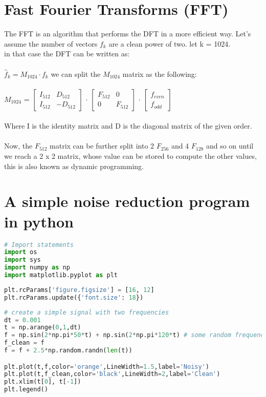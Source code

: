 \documentclass{article}
\begin{document}
\section{Fast Fourier Transforms (FFT)}
The FFT is an algorithm that performs the DFT in a more efficient way. Let's assume the number of vectors $f_{k}$ are a clean power of two.
let k = 1024.\\
in that case the DFT can be written as:\\
\\
$\hat{f}_{k} = M_{1024} \cdot f_{k}$
we can split the $M_{1024}$ matrix as the following:\\
\\
$M_{1024}$ = $\begin{bmatrix} I_{512} & D_{512}\\ I_{512} & -D_{512} \end{bmatrix}$ $\cdot$ $\begin{bmatrix} F_{512} & 0\\ 0 & F_{512} \end{bmatrix}$ $\cdot$ $\begin{bmatrix} f_{even}\\ f_{odd} \end{bmatrix}$\\
\\
Where I is the identity matrix and D is the diagonal matrix of the given order.\\
\\
Now, the $F_{512}$ matrix can be further split into 2 $F_{256}$ and 4 $F_{128}$ and so on until we reach a 2 x 2 matrix, whose value can be stored to compute the other values, this is also known as dynamic programming.\\
\section{A simple noise reduction program in python}

\begin{lstlisting}[language=Python]
# Import statements
import os
import sys
import numpy as np
import matplotlib.pyplot as plt
\end{lstlisting}

\begin{lstlisting}[language=Python]
plt.rcParams['figure.figsize'] = [16, 12]
plt.rcParams.update({'font.size': 18})
\end{lstlisting}

\begin{lstlisting}[language=Python]
# create a simple signal with two frequencies
dt = 0.001
t = np.arange(0,1,dt)
f = np.sin(2*np.pi*50*t) + np.sin(2*np.pi*120*t) # some random frequencies
f_clean = f
f = f + 2.5*np.random.randn(len(t))

plt.plot(t,f,color='orange',LineWidth=1.5,label='Noisy')
plt.plot(t,f_clean,color='black',LineWidth=2,label='Clean')
plt.xlim(t[0], t[-1])
plt.legend()
\end{lstlisting}
\end{document}
